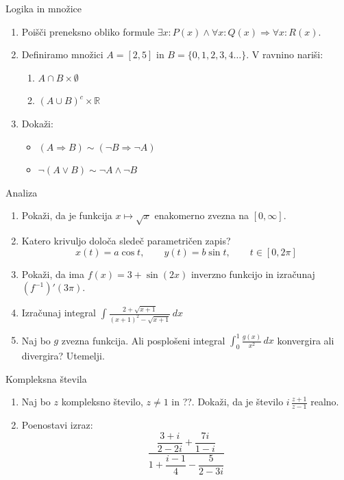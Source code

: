 \begin{frame}{Logika in množice}
	\begin{enumerate}
		\item
		Poišči preneksno obliko formule $\exists x : P(x) \land \forall x : Q(x) \Rightarrow \forall x: R(x)$.
		\item 
		Definiramo množici $A = [2,5]$ in $B = \{0,1,2,3,4\ldots\}$.
		V ravnino nariši:
		\begin{enumerate}
		   \item $A \cap B \times \emptyset$
		   \item $(A \cup B)^c \times \mathbb{R}$
		\end{enumerate}
		\item
		Dokaži:
		\begin{itemize}
			\item $(A \Rightarrow B) \sim (\lnot B \Rightarrow \lnot A)$
			\item $\lnot (A \lor B) \sim \lnot A \land \lnot B$
		\end{itemize}
	\end{enumerate}
\end{frame}

\begin{frame}{Analiza}
	\begin{enumerate}
		\item
		Pokaži, da je funkcija $x \mapsto \sqrt{x} $ enakomerno zvezna na $[0, \infty]$.
		\item 
		Katero krivuljo določa sledeč parametričen zapis?
		$$
		   x(t) = a \cos t, \qquad%
		   y(t) = b \sin t, \qquad%
		   t \in [0, 2 \pi]
		$$ 
		\item
		Pokaži, da ima $f(x)=3+\sin(2x)$ inverzno funkcijo in izračunaj $(f^{-1})'(3\pi)$.
		
		\item
		Izračunaj integral 
		$\displaystyle \int \frac{2+\sqrt{x+1}}{(x+1)^2-\sqrt{x+1}} \,dx$
		\item 
		Naj bo $g$ zvezna funkcija. Ali posplošeni integral 
		$\int_0^1 \frac{g(x)}{x^2}\,dx$
		konvergira ali divergira? Utemelji.
	\end{enumerate}
\end{frame}

\begin{frame}{Kompleksna števila}
	\begin{enumerate}
		\item
		Naj bo $z$ kompleksno število, $z \ne 1$ in ??.
		Dokaži, da je število \( i \, \frac{z+1}{z-1} \) realno.
		\item
		Poenostavi izraz:
		$$
			\frac{\dfrac{3+i}{2-2i} + \dfrac{7i}{1-i}}{1 + \dfrac{i-1}{4} - \dfrac{5}{2-3i}}
		$$
	\end{enumerate}
\end{frame}